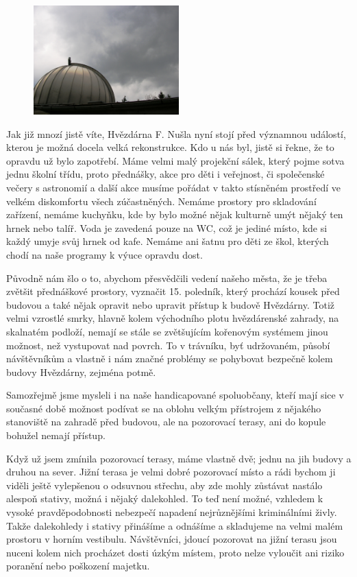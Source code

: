 \documentclass[10pt,a5paper,twoside]{book}
\begin{document}
\begin{figure}
  \begin{center}
    \includegraphics[width=0.5\textwidth]{bourka.JPG}
  \end{center}
\end{figure}

Jak již mnozí jistě víte, Hvězdárna F. Nušla nyní stojí před významnou událostí, kterou je možná docela velká rekonstrukce. Kdo u nás byl, jistě si řekne, že to opravdu už bylo zapotřebí.
Máme velmi malý projekční sálek, který pojme sotva jednu školní třídu, proto přednášky, akce pro děti i veřejnost, či společenské večery s astronomií a další akce musíme pořádat v takto stísněném prostředí ve velkém diskomfortu všech zúčastněných. Nemáme prostory pro skladování zařízení, nemáme kuchyňku, kde by bylo možné nějak kulturně umýt nějaký ten hrnek nebo talíř. Voda je zavedená pouze na WC, což je jediné místo, kde si každý umyje svůj hrnek od kafe. Nemáme ani šatnu pro děti ze škol, kterých chodí na naše programy k výuce opravdu dost.

Původně nám šlo o to, abychom přesvědčili vedení našeho města, že je třeba zvětšit přednáškové prostory, vyznačit  15. poledník, který prochází kousek před budovou a také nějak opravit nebo upravit přístup k budově Hvězdárny. Totiž velmi vzrostlé smrky, hlavně kolem východního plotu hvězdárenské zahrady, na skalnatém podloží, nemají se stále se zvětšujícím kořenovým systémem jinou možnost, než vystupovat nad povrch. To v trávníku, byť udržovaném, působí návštěvníkům a vlastně i nám značné problémy se pohybovat bezpečně kolem budovy Hvězdárny, zejména potmě.

Samozřejmě jsme mysleli i na naše handicapované spoluobčany, kteří mají sice v současné době možnost podívat se na oblohu velkým přístrojem z nějakého stanoviště na zahradě před budovou, ale na pozorovací terasy, ani do kopule bohužel nemají přístup.

Když už jsem zmínila pozorovací terasy, máme vlastně dvě; jednu na jih budovy a druhou na sever. Jižní terasa je velmi dobré pozorovací místo a rádi bychom ji viděli ještě vylepšenou o odsuvnou střechu, aby zde mohly zůstávat nastálo alespoň stativy, možná i nějaký dalekohled. To teď není možné, vzhledem k vysoké pravděpodobnosti nebezpečí napadení nejrůznějšími kriminálními živly. Takže dalekohledy i stativy přinášíme a odnášíme a skladujeme na velmi malém prostoru v horním vestibulu. Návštěvníci, jdoucí pozorovat na jižní terasu jsou nuceni kolem nich procházet dosti úzkým místem, proto nelze vyloučit ani riziko poranění nebo poškození majetku. 
\end{document}
